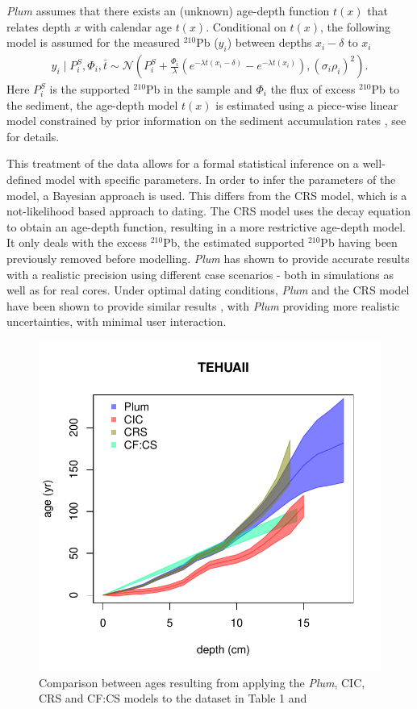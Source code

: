 \documentclass [10pt] {article}
\begin{document}
\textit{Plum} assumes that there exists an (unknown) age-depth function $t(x)$ that relates depth $x$ with calendar age $t(x)$. 
Conditional on $t(x)$, the following model is assumed for the measured $^{210}$Pb ($y_i$) between depths $x_i - \delta$ to $x_i$
\begin{eqnarray}
y_i\mid P^S_i, \Phi_i, \bar{t}\sim \mathcal{N} \left(P^S_i+\frac{\Phi_i}{\lambda} \left( e^{-\lambda t(x_i-\delta)} - e^{-\lambda t(x_i)} \right), (\sigma_i\rho_i)^2 \right). 
\end{eqnarray}
Here $P_i^S$ is the supported $^{210}$Pb in the sample and $\Phi_i$ the flux of excess $^{210}$Pb to the sediment, the age-depth model $t(x)$ is estimated using  a piece-wise linear model constrained by prior information on the sediment accumulation rates  \citep{Blaauw2011}, see \citep{Aquino2018} for details.

This treatment of the data allows for a formal statistical inference on a well-defined model with specific parameters. 
In order to infer the parameters of the model, a Bayesian approach is used.
This differs from the CRS model, which is a not-likelihood based approach to dating.
The CRS model uses the decay equation to obtain an age-depth function, resulting in a more restrictive age-depth model. 
It only deals with the excess $^{210}$Pb, the estimated supported $^{210}$Pb having been previously removed before modelling.
\textit{Plum} has shown to provide accurate results with a realistic precision using different case scenarios \citep{Aquino2018,Aquino2020} - both in simulations as well as for real cores.
Under optimal dating conditions, \textit{Plum} and the CRS model have been shown to provide similar results \citep{Aquino2020}, with \textit{Plum} providing more realistic uncertainties, with minimal user interaction.

\begin{figure}[h!]
 \centering
	\includegraphics[width=.75\linewidth]{TEHUAII.pdf}
	\caption{Comparison between ages resulting from applying the \textit{Plum}, CIC, CRS and CF:CS models to the dataset in Table 1 and \citet{Sanchez-Cabeza2012}} 
  \label{fig:tehuaii}
\end{figure}
\end{document}
